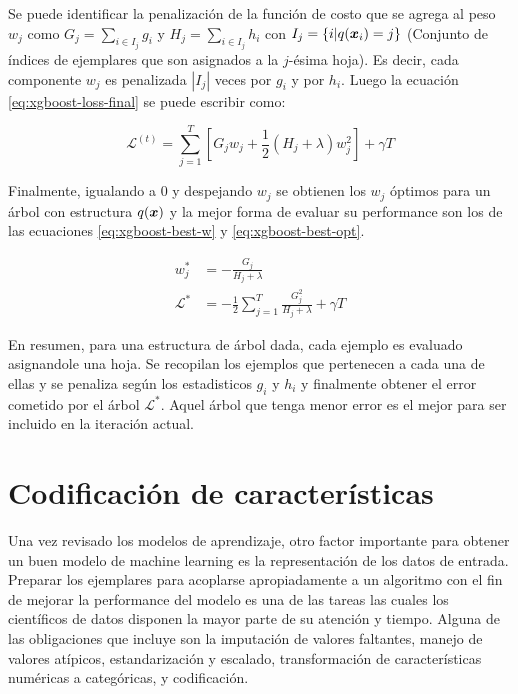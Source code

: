 Se puede identificar la penalización de la función de costo que se agrega al
peso $w_j$ como $G_{j} = \sum_{i \in I_j} g_i$ y $H_j = \sum_{i \in I_j} h_i$
con $I_j = \{i | q(\boldsymbol{x}_i) = j\}$ (Conjunto de índices de ejemplares que son
asignados a la $j$-ésima hoja). Es decir, cada componente $w_j$ es penalizada
$|I_{j}|$ veces por $g_i$ y por $h_i$. Luego la ecuación
\ref{eq:xgboost-loss-final} se puede escribir como:

\begin{equation}
    \mathcal{L}^{(t)} = \sum_{j = 1}^{T}[G_j w_j + \frac{1}{2} (H_j + \lambda)w_j^2] + \gamma T
\end{equation}

Finalmente, igualando a $0$ y despejando $w_j$ se obtienen los $w_j$ óptimos para
un árbol con estructura $q(\boldsymbol{x})$ y la mejor forma de evaluar su performance
son los de las ecuaciones \ref{eq:xgboost-best-w} y \ref{eq:xgboost-best-opt}.

\begin{align}
    w_{j}^{*} &= - \frac{G_j}{H_j + \lambda} \label{eq:xgboost-best-w}\\
    \mathcal{L}^{*} &= -\frac{1}{2} \sum_{j=1}^{T} \frac{G_{j}^{2}}{H_j + \lambda} + \gamma T \label{eq:xgboost-best-opt}
\end{align}

En resumen, para una estructura de árbol dada, cada ejemplo es evaluado
asignandole una hoja. Se recopilan los ejemplos que pertenecen a cada una de
ellas y se penaliza según los estadisticos $g_i$ y $h_i$ y finalmente obtener el
error cometido por el árbol $\mathcal{L^{*}}$. Aquel árbol que tenga menor error
es el mejor para ser incluido en la iteración actual.

\section{Codificación de características}

Una vez revisado los modelos de aprendizaje, otro factor importante para obtener un buen modelo de machine learning es la representación de los datos de entrada. Preparar los ejemplares para acoplarse apropiadamente a un algoritmo con el fin de mejorar la performance del modelo es una de las tareas las cuales los
científicos de datos disponen la mayor parte de su atención y tiempo. Alguna de
las obligaciones que incluye son la imputación de valores faltantes, manejo de
valores atípicos, estandarización y escalado, transformación de características
numéricas a categóricas, y codificación.

